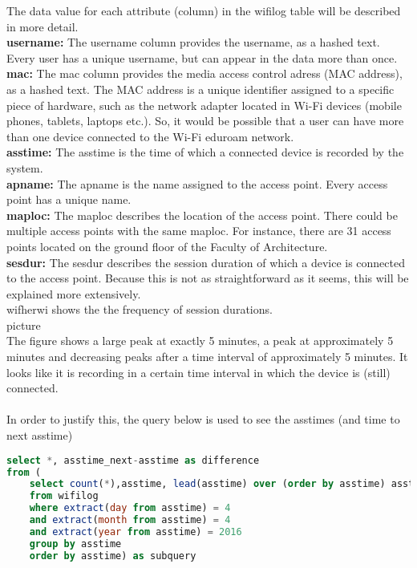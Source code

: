 The data value for each attribute (column) in the wifilog table will be described in more detail. 
\\
\textbf{username:}
The username column provides the username, as a hashed text. Every user has a unique username, but can appear in the data more than once.
\\
\textbf{mac:}
The mac column provides the media access control adress (MAC address), as a hashed text. The MAC address is a unique identifier assigned to a specific piece of hardware, such as the network adapter located in Wi-Fi devices (mobile phones, tablets, laptops etc.). So, it would be possible that a user can have more than one device connected to the Wi-Fi eduroam network.
\\
\textbf{asstime:}
The asstime is the time of which a connected device is recorded by the system.
\\
\textbf{apname:}
The apname is the name assigned to the access point. Every access point has a unique name. 
\\
\textbf{maploc:}
The maploc describes the location of the access point. There could be multiple access points with the same maploc. For instance, there are 31 access points located on the ground floor of the Faculty of Architecture.
\\
\textbf{sesdur:}
The sesdur describes the session duration of which a device is connected to the access point. Because this is not as straightforward as it seems, this will be explained more extensively.
\\
wifherwi shows the the frequency of session durations.
\\
picture
\\
The figure shows a large peak at exactly 5 minutes, a peak at approximately 5 minutes and decreasing peaks after a time interval of approximately 5 minutes. It looks like it is recording in a certain time interval in which the device is (still) connected. \\\\
In order to justify this, the query below is used to see the asstimes (and time to next asstime)
\\
\begin{lstlisting}[language=SQL]
select *, asstime_next-asstime as difference
from (
	select count(*),asstime, lead(asstime) over (order by asstime) asstime_next
	from wifilog
	where extract(day from asstime) = 4
	and extract(month from asstime) = 4
	and extract(year from asstime) = 2016
	group by asstime
	order by asstime) as subquery
\end{lstlisting}


